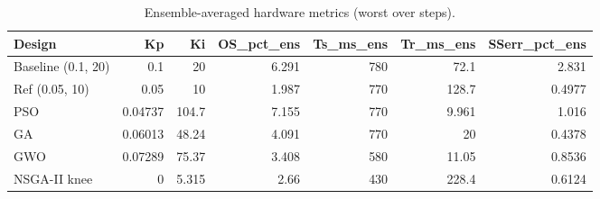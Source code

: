 \begin{table}[t]
\centering\caption{Ensemble-averaged hardware metrics (worst over steps).}\label{tab:hwens}
\begin{tabular}{lrrrrrr}
\toprule
Design & Kp & Ki & OS\_pct\_ens & Ts\_ms\_ens & Tr\_ms\_ens & SSerr\_pct\_ens \\
\midrule
Baseline (0.1, 20) & 0.1 & 20 & 6.291 & 780 & 72.1 & 2.831 \\
Ref (0.05, 10) & 0.05 & 10 & 1.987 & 770 & 128.7 & 0.4977 \\
PSO & 0.04737 & 104.7 & 7.155 & 770 & 9.961 & 1.016 \\
GA & 0.06013 & 48.24 & 4.091 & 770 & 20 & 0.4378 \\
GWO & 0.07289 & 75.37 & 3.408 & 580 & 11.05 & 0.8536 \\
NSGA-II knee & 0 & 5.315 & 2.66 & 430 & 228.4 & 0.6124 \\
\bottomrule
\end{tabular}
\end{table}
